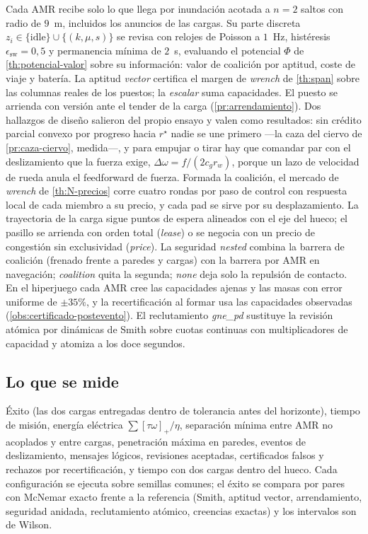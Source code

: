 Cada AMR recibe solo lo que llega por inundación acotada a $n=2$ saltos con
radio de $9$~m, incluidos los anuncios de las cargas. Su parte discreta
$z_i\in\{\mathrm{idle}\}\cup\{(k,\mu,s)\}$ se revisa con relojes de Poisson
a $1$~Hz, histéresis $\epsilon_{\mathrm{sw}}=0{,}5$ y permanencia mínima de
$2$~s, evaluando el potencial $\Phi$ de \cref{th:potencial-valor} sobre su
información: valor de coalición por aptitud, coste de viaje y batería. La
aptitud \emph{vector} certifica el margen de \emph{wrench} de
\cref{th:span} sobre las columnas reales de los puestos; la \emph{escalar}
suma capacidades. El puesto se arrienda con versión ante el tender de la
carga (\cref{pr:arrendamiento}). Dos hallazgos de diseño salieron del propio
ensayo y valen como resultados: sin crédito parcial convexo por progreso hacia
$r^\star$ nadie se une primero —la caza del ciervo de
\cref{pr:caza-ciervo}, medida—, y para empujar o tirar hay que comandar par
con el deslizamiento que la fuerza exige, $\Delta\omega=f/(2c_gr_w)$, porque
un lazo de velocidad de rueda anula el feedforward de fuerza. Formada la
coalición, el mercado de \emph{wrench} de \cref{th:N-precios} corre cuatro
rondas por paso de control con respuesta local de cada miembro a su precio, y
cada pad se sirve por su desplazamiento. La trayectoria de la carga sigue
puntos de espera alineados con el eje del hueco; el pasillo se arrienda con
orden total (\emph{lease}) o se negocia con un precio de congestión sin
exclusividad (\emph{price}). La seguridad \emph{nested} combina la barrera
de coalición (frenado frente a paredes y cargas) con la barrera por AMR en
navegación; \emph{coalition} quita la segunda; \emph{none} deja solo la
repulsión de contacto. En el hiperjuego cada AMR cree las capacidades ajenas y
las masas con error uniforme de $\pm35\%$, y la recertificación al formar
usa las capacidades observadas (\cref{obs:certificado-postevento}). El
reclutamiento \emph{gne\_pd} sustituye la revisión atómica por dinámicas de
Smith sobre cuotas continuas con multiplicadores de capacidad y atomiza a los
doce segundos.

\subsection{Lo que se mide}

Éxito (las dos cargas entregadas dentro de tolerancia antes del horizonte),
tiempo de misión, energía eléctrica $\sum[\tau\omega]_+/\eta$, separación
mínima entre AMR no acoplados y entre cargas, penetración máxima en paredes,
eventos de deslizamiento, mensajes lógicos, revisiones aceptadas,
certificados falsos y rechazos por recertificación, y tiempo con dos cargas
dentro del hueco. Cada configuración se ejecuta sobre semillas comunes; el
éxito se compara por pares con McNemar exacto frente a la referencia (Smith,
aptitud vector, arrendamiento, seguridad anidada, reclutamiento atómico,
creencias exactas) y los intervalos son de Wilson.


